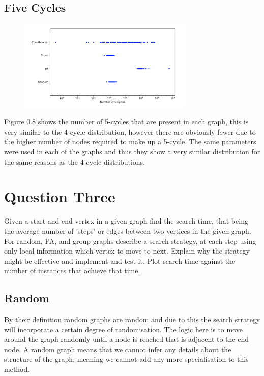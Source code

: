 \documentclass[paper=a4, fontsize=11pt]{scrartcl}
\numberwithin{equation}{section}		%
\numberwithin{figure}{section}			%
\numberwithin{table}{section}				%
\begin{document}
\subsection*{Five Cycles}

\begin{figure}[h]
\center
\caption{}
\includegraphics[width=0.75\textwidth]{pictures/5cycle.png}
\end{figure}

Figure 0.8 shows the number of 5-cycles that are present in each graph, this is very similar to the 4-cycle distribution, however there are obviously fewer due to the higher number of nodes required to make up a 5-cycle. The same parameters were used in each of the graphs and thus they show a very similar distribution for the same reasons as the 4-cycle distributions.

\section*{Question Three}

Given a start and end vertex in a given graph find the search time, that being the average number of 'steps' or edges between two vertices in the given graph. For random, PA, and group graphs describe a search strategy, at each step using only local information which vertex to move to next. Explain why the strategy might be effective and implement and test it. Plot search time against the number of instances that achieve that time.

\subsection*{Random}

By their definition random graphs are random and due to this the search strategy will incorporate a certain degree of randomisation. The logic here is to move around the graph randomly until a node is reached that is adjacent to the end node. A random graph means that we cannot infer any details about the structure of the graph, meaning we cannot add any more specialisation to this method. \\
\end{document}

